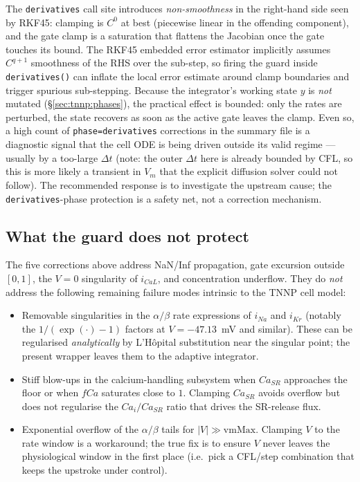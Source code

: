 \documentclass[11pt,a4paper]{article}
\newcommand{\Vm}{V_{m}}
\newcommand{\code}[1]{\texttt{\small #1}}
\begin{document}
The \code{derivatives} call site introduces \emph{non-smoothness} in
the right-hand side seen by RKF45: clamping is $C^{0}$ at best
(piecewise linear in the offending component), and the gate clamp is
a saturation that flattens the Jacobian once the gate touches its
bound. The RKF45 embedded error estimator implicitly assumes
$C^{q+1}$ smoothness of the RHS over the sub-step, so firing the
guard inside \code{derivatives()} can inflate the local error
estimate around clamp boundaries and trigger spurious sub-stepping.
Because the integrator's working state $y$ is \emph{not} mutated
(\S\ref{sec:tnnp:phases}), the practical effect is bounded: only the
rates are perturbed, the state recovers as soon as the active gate
leaves the clamp. Even so, a high count of \code{phase=derivatives}
corrections in the summary file is a diagnostic signal that the cell
ODE is being driven outside its valid regime — usually by a too-large
$\Delta t$ (note: the outer $\Delta t$ here is already bounded by CFL,
so this is more likely a transient in $\Vm$ that the explicit
diffusion solver could not follow). The recommended response is to
investigate the upstream cause; the \code{derivatives}-phase
protection is a safety net, not a correction mechanism.

\subsection{What the guard does not protect}
\label{sec:tnnp:notProtected}

The five corrections above address NaN/Inf propagation, gate
excursion outside $[0,1]$, the $V=0$ singularity of $i_{CaL}$, and
concentration underflow. They do \emph{not} address the following
remaining failure modes intrinsic to the TNNP cell model:

\begin{itemize}[leftmargin=*]
\item Removable singularities in the $\alpha/\beta$ rate expressions
of $i_{Na}$ and $i_{Kr}$ (notably the $1/(\exp(\cdot)-1)$ factors at
$V = -47.13$~mV and similar). These can be regularised
\emph{analytically} by L'H\^opital substitution near the singular
point; the present wrapper leaves them to the adaptive integrator.
\item Stiff blow-ups in the calcium-handling subsystem when $Ca_{SR}$
approaches the floor or when $fCa$ saturates close to $1$. Clamping
$Ca_{SR}$ avoids overflow but does not regularise the
$Ca_{i}/Ca_{SR}$ ratio that drives the SR-release flux.
\item Exponential overflow of the $\alpha/\beta$ tails for $|V| \gg
\text{vmMax}$. Clamping $V$ to the rate window is a workaround; the
true fix is to ensure $V$ never leaves the physiological window in
the first place (i.e.\ pick a CFL/step combination that keeps the
upstroke under control).
\end{itemize}
\end{document}
